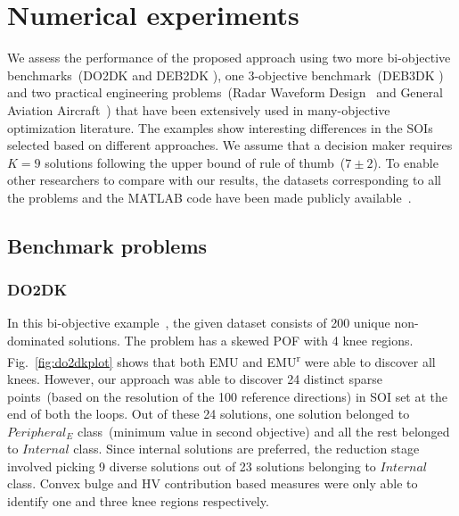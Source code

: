 \section{Numerical experiments}
\label{sec:numex} 

We assess the performance of the proposed approach using two more bi-objective benchmarks~(DO2DK and DEB2DK \cite{branke2004finding}), one 3-objective benchmark~(DEB3DK \cite{branke2004finding}) and two practical engineering problems~(Radar Waveform Design~\cite{hughes2007radar} and General Aviation Aircraft~\cite{Simpson1996}) that have been extensively used in many-objective optimization literature. The examples show interesting differences in the SOIs selected based on different approaches. We assume that a decision maker requires $K=9$ solutions following the upper bound of rule of thumb~($7\pm 2$). To enable other researchers to compare with our results, the datasets corresponding to all the problems and the MATLAB code have been made publicly available~\cite{benchmark}.

\subsection{Benchmark problems}

\subsubsection{DO2DK}
In this bi-objective example~\cite{branke2004finding}, the given dataset consists of 200 unique non-dominated solutions. The problem has a skewed POF with 4 knee regions. Fig.~\ref{fig:do2dkplot} shows that both EMU and EMU\textsuperscript{r} were able to discover all knees. However, our approach was able to discover 24 distinct sparse points~(based on the resolution of the 100 reference directions) in SOI set at the end of both the loops. Out of these 24 solutions, one solution belonged to $Peripheral_E$ class~(minimum value in second objective) and all the rest belonged to $Internal$ class. Since internal solutions are preferred, the reduction stage involved picking 9 diverse solutions out of 23 solutions belonging to $Internal$ class. Convex bulge and HV contribution based measures were only able to identify one and three knee regions respectively.

\begin{figure*}[!htb]
	\centering    
	\quad
	\quad
	\quad
	\quad      
	\caption{DO2DK with 4 knee regions: (a) EMU\textsuperscript{r}, (b) EMU, (c) Convex Bulge, (d) HV contribution}
	\label{fig:do2dkplot}
\end{figure*}

